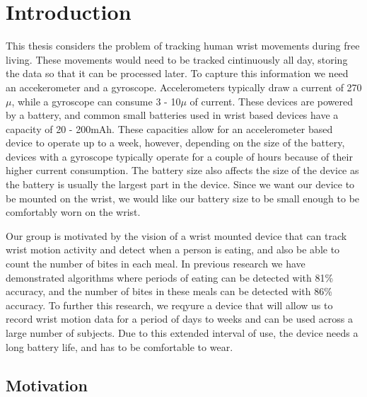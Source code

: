 
\chapter{Introduction}
\label{Chap:Intro}
This thesis considers the problem of tracking human wrist movements during free living.
These movements would need to be tracked cintinuously all day,
storing the data so that it can be processed later.
To capture this information we need an accekerometer and a gyroscope.
Accelerometers typically draw a current of 270$\mu$,
while a gyroscope can consume 3 - 10$\mu$ of current.
These devices are powered by a battery,
and common small batteries used in wrist based devices have a capacity of 20 - 200mAh.
These capacities allow for an accelerometer based device to operate up to a week,
however, depending on the size of the battery,
devices with a gyroscope typically operate for a couple of hours because of their higher current consumption.
The battery size also affects the size of the device as the battery is usually the largest part in the device.
Since we want our device to be mounted on the wrist,
we would like our battery size to be small enough to be comfortably worn on the wrist.

Our group is motivated by the vision of a wrist mounted device that can track wrist motion activity and
detect when a person is eating,
and also be able to count the number of bites in each meal.
In previous research we have demonstrated algorithms where periods of eating can be detected with 81\% accuracy,
and the number of bites in these meals can be detected with 86\% accuracy.
To further this research,
we reqyure a device that will allow us to record wrist motion data for a period of days to weeks and can be used across a large number of subjects.
Due to this extended interval of use,
the device needs a long battery life,
and has to be comfortable to wear.


\section{Motivation}
\label{Sec:Motivation}

